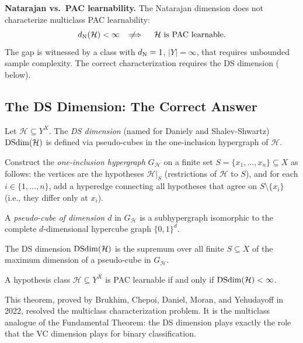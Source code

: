 \begin{separation}
\textbf{Natarajan vs.\ PAC learnability.}  The Natarajan dimension does not
characterize multiclass PAC learnability:
\[
  d_{\mathrm{N}}(\mathcal{H}) < \infty
  \quad\not\!\!\!\implies\quad
  \mathcal{H} \text{ is PAC learnable}.
\]
The gap is witnessed by a class with $d_{\mathrm{N}} = 1$, $|Y| = \infty$, that
requires unbounded sample complexity.  The correct characterization requires
the DS dimension ( below).
\end{separation}


\subsection{The DS Dimension: The Correct Answer}

\begin{defn}
\label{def:ds-dim}
Let $\mathcal{H} \subseteq Y^X$.  The \emph{DS dimension} (named for
Daniely and Shalev-Shwartz) $\mathrm{DSdim}(\mathcal{H})$ is defined via
pseudo-cubes in the one-inclusion hypergraph of $\mathcal{H}$.

Construct the \emph{one-inclusion hypergraph} $G_\mathcal{H}$ on a finite set
$S = \{x_1, \ldots, x_n\} \subseteq X$ as follows: the vertices are the
hypotheses $\mathcal{H}|_S$ (restrictions of $\mathcal{H}$ to $S$), and for
each $i \in \{1, \ldots, n\}$, add a hyperedge connecting all hypotheses
that agree on $S \setminus \{x_i\}$ (i.e., they differ only at $x_i$).

A \emph{pseudo-cube of dimension $d$} in $G_\mathcal{H}$ is a subhypergraph
isomorphic to the complete $d$-dimensional hypercube graph $\{0,1\}^d$.

The DS dimension $\mathrm{DSdim}(\mathcal{H})$ is the supremum over all finite
$S \subseteq X$ of the maximum dimension of a pseudo-cube in $G_\mathcal{H}$.
\end{defn}

\begin{thm}
\label{thm:ds-char}
A hypothesis class $\mathcal{H} \subseteq Y^X$ is PAC learnable if and only
if $\mathrm{DSdim}(\mathcal{H}) < \infty$.
\end{thm}

This theorem, proved by Brukhim, Chepoi, Daniel, Moran, and Yehudayoff in
2022, resolved the multiclass characterization problem.  It is the
multiclass analogue of the Fundamental Theorem: the DS dimension plays
exactly the role that the VC dimension plays for binary classification.

